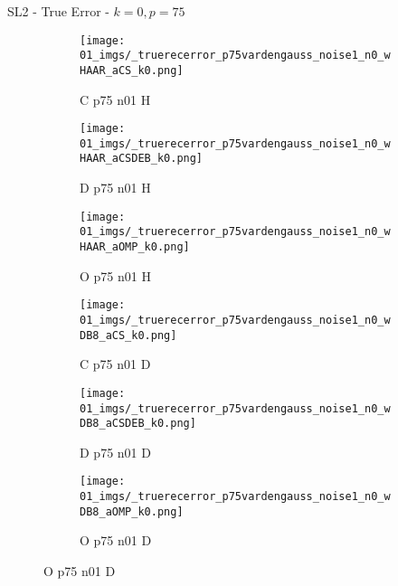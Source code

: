 \begin{frame}{SL2 - True Error - $k=0,p=75$}{}
\begin{figure}
\begin{subfigure}{0.13\textwidth}
\texttt{[image: 01\_imgs/\_truerecerror\_p75vardengauss\_noise1\_n0\_wHAAR\_aCS\_k0.png]}
\caption*{\tiny C p75 n01 H}
\end{subfigure}
\begin{subfigure}{0.13\textwidth}
\texttt{[image: 01\_imgs/\_truerecerror\_p75vardengauss\_noise1\_n0\_wHAAR\_aCSDEB\_k0.png]}
\caption*{\tiny D p75 n01 H}
\end{subfigure}
\begin{subfigure}{0.13\textwidth}
\texttt{[image: 01\_imgs/\_truerecerror\_p75vardengauss\_noise1\_n0\_wHAAR\_aOMP\_k0.png]}
\caption*{\tiny O p75 n01 H}
\end{subfigure}
\begin{subfigure}{0.13\textwidth}
\texttt{[image: 01\_imgs/\_truerecerror\_p75vardengauss\_noise1\_n0\_wDB8\_aCS\_k0.png]}
\caption*{\tiny C p75 n01 D}
\end{subfigure}
\begin{subfigure}{0.13\textwidth}
\texttt{[image: 01\_imgs/\_truerecerror\_p75vardengauss\_noise1\_n0\_wDB8\_aCSDEB\_k0.png]}
\caption*{\tiny D p75 n01 D}
\end{subfigure}
\begin{subfigure}{0.13\textwidth}
\texttt{[image: 01\_imgs/\_truerecerror\_p75vardengauss\_noise1\_n0\_wDB8\_aOMP\_k0.png]}
\caption*{\tiny O p75 n01 D}
\end{subfigure}

\vspace{5pt}


\end{figure}
\end{frame}
